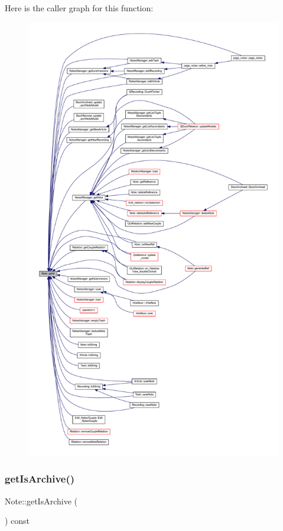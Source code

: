 Here is the caller graph for this function\+:
\nopagebreak
\begin{figure}[H]
\begin{center}
\leavevmode
\includegraphics[height=550pt]{class_note_afafbebe4aa35b8d29d903bc53fa31929_icgraph}
\end{center}
\end{figure}
\mbox{\label{class_note_a3ff22c94b72b8c5cb93638bd16262d0d}} 
\subsubsection{\texorpdfstring{get\+Is\+Archive()}{getIsArchive()}}
{\footnotesize\ttfamily Note\+::get\+Is\+Archive (\begin{DoxyParamCaption}{ }\end{DoxyParamCaption}) const\hspace{0.3cm}{\ttfamily [inline]}}



